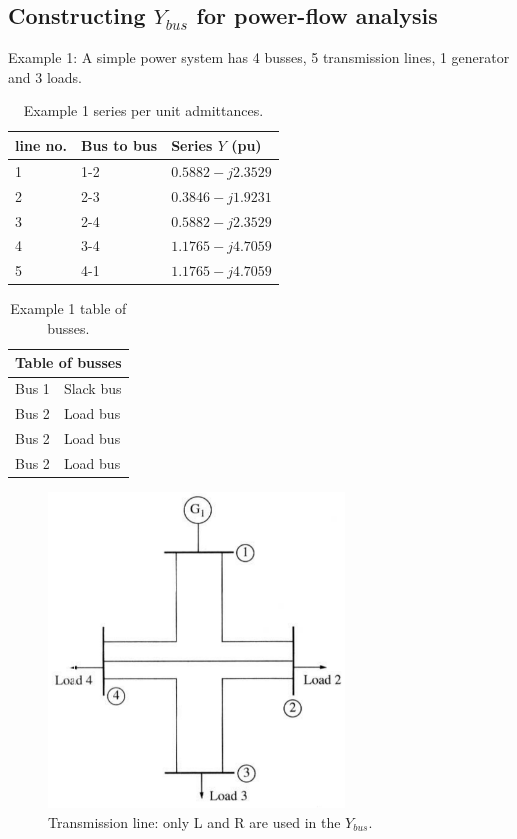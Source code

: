 \subsection{Constructing $Y_{bus}$ for power-flow analysis}
Example 1: A simple power system has 4 busses, 5 transmission lines, 1 generator and 3 loads.
\begin{table}[H]
	\centering
	\begin{tabular}{@{}lll@{}}
		\toprule
		\textbf{line no.} & \textbf{Bus to bus} & \textbf{Series $Y$ (pu)}\\
		\midrule
		1 & 1-2 & $0.5882 - j2.3529$\\
		2 & 2-3 & $0.3846 - j1.9231$\\
		3 & 2-4 & $0.5882 - j2.3529$\\
		4 & 3-4 & $1.1765 - j4.7059$\\
		5 & 4-1 & $1.1765 - j4.7059$\\
		\bottomrule
	\end{tabular}
	\caption{Example 1 series per unit admittances.}
\end{table}
\begin{table}[H]
	\centering
	\begin{tabular}{@{}ll@{}}
		\toprule
		\multicolumn{2}{l}{\textbf{Table of busses}}\\
		\midrule
		Bus 1 & Slack bus\\
		Bus 2 & Load bus\\
		Bus 2 & Load bus\\		
		Bus 2 & Load bus\\
		\bottomrule
	\end{tabular}
	\caption{Example 1 table of busses.}
\end{table}
\begin{figure}[H]
	\centering
	\includegraphics[width = 0.7\textwidth]{./img/figure50.png}
	\caption{Transmission line: only L and R are used in the $Y_{bus}$.}
\end{figure}
